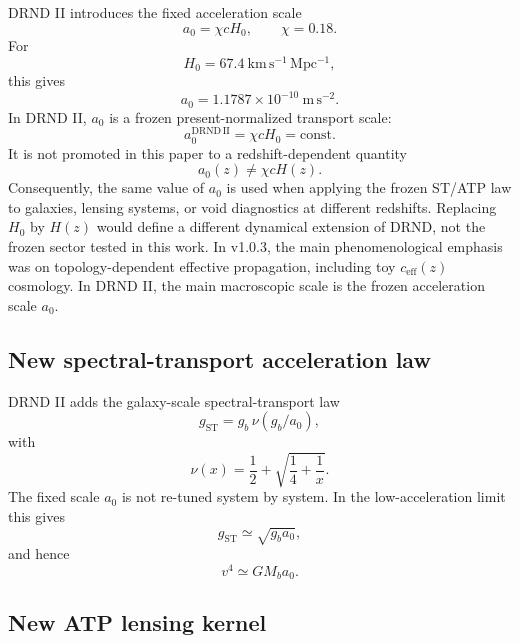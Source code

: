 \documentclass[12pt]{iopart}
\begin{document}
DRND II introduces the fixed acceleration scale
\begin{equation}
a_0=\chi cH_0,
\qquad
\chi=0.18.
\end{equation}
For
\begin{equation}
H_0=67.4~\mathrm{km\,s^{-1}\,Mpc^{-1}},
\end{equation}
this gives
\begin{equation}
a_0=1.1787\times10^{-10}~\mathrm{m\,s^{-2}}.
\end{equation}
In DRND II, \(a_0\) is a frozen present-normalized transport scale:
\begin{equation}
a_0^{\mathrm{DRND\,II}}
=
\chi cH_0
=
\mathrm{const}.
\label{eq:a0_frozen}
\end{equation}
It is not promoted in this paper to a redshift-dependent quantity
\begin{equation}
a_0(z)\neq \chi cH(z).
\end{equation}
Consequently, the same value of \(a_0\) is used when applying the frozen ST/ATP law to galaxies, lensing systems, or void diagnostics at different redshifts. Replacing \(H_0\) by \(H(z)\) would define a different dynamical extension of DRND, not the frozen sector tested in this work.
In v1.0.3, the main phenomenological emphasis was on topology-dependent effective propagation, including toy \(c_{\mathrm{eff}}(z)\) cosmology. In DRND II, the main macroscopic scale is the frozen acceleration scale \(a_0\).

\subsection{New spectral-transport acceleration law}

DRND II adds the galaxy-scale spectral-transport law
\begin{equation}
g_{\mathrm{ST}}
=
g_b\,\nu(g_b/a_0),
\end{equation}
with
\begin{equation}
\nu(x)
=
\frac12+\sqrt{\frac14+\frac1x}.
\end{equation}
The fixed scale \(a_0\) is not re-tuned system by system. In the low-acceleration limit this gives
\begin{equation}
g_{\mathrm{ST}}\simeq \sqrt{g_ba_0},
\end{equation}
and hence
\begin{equation}
v^4\simeq GM_ba_0.
\end{equation}

\subsection{New ATP lensing kernel}
\end{document}
